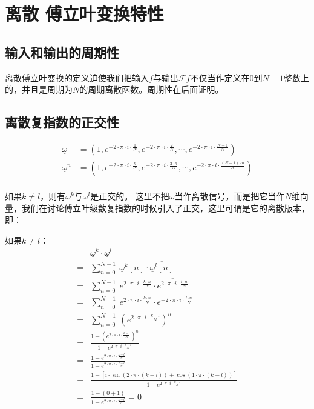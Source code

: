 \section{离散 傅立叶变换特性}
\subsection{输入和输出的周期性}
离散傅立叶变换的定义迫使我们把输入$\underline{f}$与输出$\underline{\mathcal{F}f}$不仅当作定义在$0$到$N-1$整数上的，并且是周期为$N$的周期离散函数。周期性在后面证明。


\subsection{离散复指数的正交性}
\begin{align*}
	\underline{\omega}   & =(1,e^{-2\cdot \pi\cdot i\cdot\frac{1}{N}},e^{-2\cdot \pi\cdot i\cdot\frac{2}{N}},\cdots,e^{-2\cdot \pi\cdot i\cdot\frac{N-1}{N}})                 \\
	\underline{\omega}^n & =(1,e^{-2\cdot \pi\cdot i\cdot\frac{n}{N}},e^{-2\cdot \pi\cdot i\cdot\frac{2\cdot n}{N}},\cdots,e^{-2\cdot \pi\cdot i\cdot\frac{(N-1)\cdot n}{N}}) \\
\end{align*}

如果$k\neq l$，则有$\underline{\omega}^k$与$\underline{\omega}^l$是正交的。
这里不把$\underline{\omega}$当作离散信号，而是把它当作$N$维向量，我们在讨论傅立叶级数复指数的时候引入了正交，这里可谓是它的离散版本，即：

如果$k\neq l$：
\begin{align*}
	  & \underline{\omega}^k\cdot \underline{\omega}^l                                                                                       \\
	= & \sum\limits_{n=0}^{N-1}\ \underline{\omega}^k[n]\cdot \overline{\underline{\omega}^l[n]}                                             \\
	= & \sum\limits_{n=0}^{N-1}\ e^{2\cdot \pi\cdot i\cdot \frac{k\cdot n}{N}}\cdot \overline{e^{2\cdot \pi\cdot i\cdot \frac{l\cdot n}{N}}} \\
	= & \sum\limits_{n=0}^{N-1}\ e^{2\cdot \pi\cdot i\cdot \frac{k\cdot n}{N}}\cdot e^{-2\cdot \pi\cdot i\cdot \frac{l\cdot n}{N}}           \\
	= & \sum\limits_{n=0}^{N-1}\ (e^{2\cdot \pi\cdot i\cdot \frac{k-l}{N}})^n                                                                \\
	= & \frac{1-(e^{2\cdot \pi\cdot i\cdot \frac{k-l}{N}})^n}{1-e^{2\cdot \pi\cdot i\cdot \frac{k-l}{N}}}                                    \\
	= & \frac{1-e^{2\cdot \pi\cdot i\cdot \frac{k-l}{N}}}{1-e^{2\cdot \pi\cdot i\cdot \frac{k-l}{N}}}                                        \\
	= & \frac{1-[i\cdot\sin(2\cdot\pi\cdot(k-l))+\cos(1\cdot\pi\cdot(k-l))]}{1-e^{2\cdot \pi\cdot i\cdot \frac{k-l}{N}}}                     \\
	= & \frac{1-(0+1)}{1-e^{2\cdot \pi\cdot i\cdot \frac{k-l}{N}}}=0
\end{align*}


